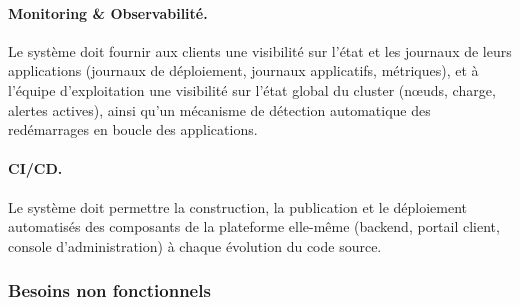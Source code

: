    \paragraph{Monitoring \& Observabilité.} Le système doit fournir aux clients une visibilité sur l'état et les journaux de leurs applications (journaux de déploiement, journaux applicatifs, métriques), et à l'équipe d'exploitation une visibilité sur l'état global du cluster (nœuds, charge, alertes actives), ainsi qu'un mécanisme de détection automatique des redémarrages en boucle des applications.
    
    \paragraph{CI/CD.} Le système doit permettre la construction, la publication et le déploiement automatisés des composants de la plateforme elle-même (backend, portail client, console d'administration) à chaque évolution du code source.
    
    \subsubsection{Besoins non fonctionnels}
    
